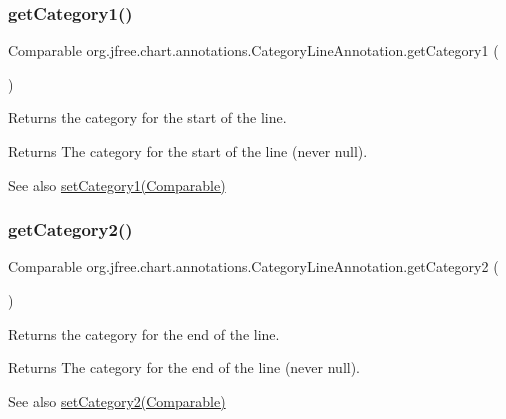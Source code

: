 \subsubsection{\texorpdfstring{get\+Category1()}{getCategory1()}}
{\footnotesize\ttfamily Comparable org.\+jfree.\+chart.\+annotations.\+Category\+Line\+Annotation.\+get\+Category1 (\begin{DoxyParamCaption}{ }\end{DoxyParamCaption})}

Returns the category for the start of the line.

\begin{DoxyReturn}{Returns}
The category for the start of the line (never {\ttfamily null}).
\end{DoxyReturn}
\begin{DoxySeeAlso}{See also}
\mbox{\hyperlink{classorg_1_1jfree_1_1chart_1_1annotations_1_1_category_line_annotation_a938e3f8962167a40fa217f1c9ede6bee}{set\+Category1(\+Comparable)}} 
\end{DoxySeeAlso}
\mbox{\label{classorg_1_1jfree_1_1chart_1_1annotations_1_1_category_line_annotation_a66690ee750cd82f99ccf3358fe57007b}} 
\subsubsection{\texorpdfstring{get\+Category2()}{getCategory2()}}
{\footnotesize\ttfamily Comparable org.\+jfree.\+chart.\+annotations.\+Category\+Line\+Annotation.\+get\+Category2 (\begin{DoxyParamCaption}{ }\end{DoxyParamCaption})}

Returns the category for the end of the line.

\begin{DoxyReturn}{Returns}
The category for the end of the line (never {\ttfamily null}).
\end{DoxyReturn}
\begin{DoxySeeAlso}{See also}
\mbox{\hyperlink{classorg_1_1jfree_1_1chart_1_1annotations_1_1_category_line_annotation_a49f3bccd488d3de9cd343be3057d6da9}{set\+Category2(\+Comparable)}} 
\end{DoxySeeAlso}
\mbox{\label{classorg_1_1jfree_1_1chart_1_1annotations_1_1_category_line_annotation_a47cb5c29bbf096219ba83972083ca987}} 
